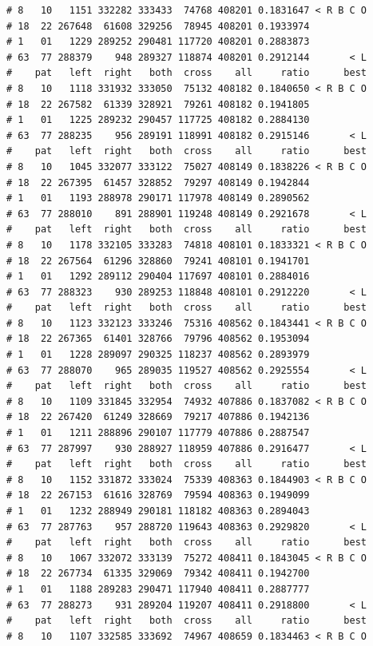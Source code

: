 \documentclass{article}\usepackage[]{graphicx}\usepackage[]{color}
\makeatletter
\newenvironment{kframe}{%
 \def\at@end@of@kframe{}%
 \ifinner\ifhmode%
  \def\at@end@of@kframe{\end{minipage}}%
  \begin{minipage}{\columnwidth}%
 \fi\fi%
 \def\FrameCommand##1{\hskip\@totalleftmargin \hskip-\fboxsep
 \colorbox{shadecolor}{##1}\hskip-\fboxsep
     \hskip-\linewidth \hskip-\@totalleftmargin \hskip\columnwidth}%
 \MakeFramed {\advance\hsize-\width
   \@totalleftmargin\z@ \linewidth\hsize
   \@setminipage}}%
 {\par\unskip\endMakeFramed%
 \at@end@of@kframe}
\newenvironment{knitrout}{}{} %
\makeatother
\begin{document}
\begin{knitrout}
\begin{kframe}
\begin{verbatim}
# 8   10   1151 332282 333433  74768 408201 0.1831647 < R B C O
# 18  22 267648  61608 329256  78945 408201 0.1933974          
# 1   01   1229 289252 290481 117720 408201 0.2883873          
# 63  77 288379    948 289327 118874 408201 0.2912144       < L
#    pat   left  right   both  cross    all     ratio      best
# 8   10   1118 331932 333050  75132 408182 0.1840650 < R B C O
# 18  22 267582  61339 328921  79261 408182 0.1941805          
# 1   01   1225 289232 290457 117725 408182 0.2884130          
# 63  77 288235    956 289191 118991 408182 0.2915146       < L
#    pat   left  right   both  cross    all     ratio      best
# 8   10   1045 332077 333122  75027 408149 0.1838226 < R B C O
# 18  22 267395  61457 328852  79297 408149 0.1942844          
# 1   01   1193 288978 290171 117978 408149 0.2890562          
# 63  77 288010    891 288901 119248 408149 0.2921678       < L
#    pat   left  right   both  cross    all     ratio      best
# 8   10   1178 332105 333283  74818 408101 0.1833321 < R B C O
# 18  22 267564  61296 328860  79241 408101 0.1941701          
# 1   01   1292 289112 290404 117697 408101 0.2884016          
# 63  77 288323    930 289253 118848 408101 0.2912220       < L
#    pat   left  right   both  cross    all     ratio      best
# 8   10   1123 332123 333246  75316 408562 0.1843441 < R B C O
# 18  22 267365  61401 328766  79796 408562 0.1953094          
# 1   01   1228 289097 290325 118237 408562 0.2893979          
# 63  77 288070    965 289035 119527 408562 0.2925554       < L
#    pat   left  right   both  cross    all     ratio      best
# 8   10   1109 331845 332954  74932 407886 0.1837082 < R B C O
# 18  22 267420  61249 328669  79217 407886 0.1942136          
# 1   01   1211 288896 290107 117779 407886 0.2887547          
# 63  77 287997    930 288927 118959 407886 0.2916477       < L
#    pat   left  right   both  cross    all     ratio      best
# 8   10   1152 331872 333024  75339 408363 0.1844903 < R B C O
# 18  22 267153  61616 328769  79594 408363 0.1949099          
# 1   01   1232 288949 290181 118182 408363 0.2894043          
# 63  77 287763    957 288720 119643 408363 0.2929820       < L
#    pat   left  right   both  cross    all     ratio      best
# 8   10   1067 332072 333139  75272 408411 0.1843045 < R B C O
# 18  22 267734  61335 329069  79342 408411 0.1942700          
# 1   01   1188 289283 290471 117940 408411 0.2887777          
# 63  77 288273    931 289204 119207 408411 0.2918800       < L
#    pat   left  right   both  cross    all     ratio      best
# 8   10   1107 332585 333692  74967 408659 0.1834463 < R B C O

\end{verbatim}
\end{kframe}
\end{knitrout}
\end{document}
